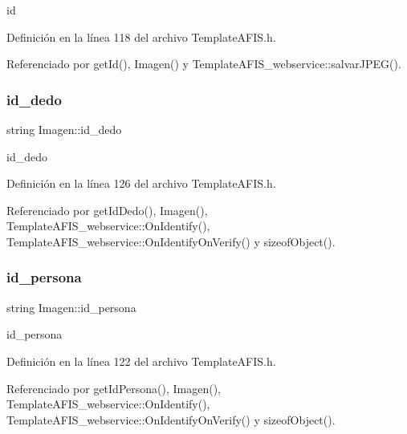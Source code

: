 id 



Definición en la línea 118 del archivo Template\+A\+F\+I\+S.\+h.



Referenciado por get\+Id(), Imagen() y Template\+A\+F\+I\+S\+\_\+webservice\+::salvar\+J\+P\+E\+G().

\hypertarget{classImagen_abdf777e9a6d41cb3b6ee54e9702d0e52}{}\label{classImagen_abdf777e9a6d41cb3b6ee54e9702d0e52} 
\subsubsection{\texorpdfstring{id\+\_\+dedo}{id\_dedo}}
{\footnotesize\ttfamily string Imagen\+::id\+\_\+dedo}



id\+\_\+dedo 



Definición en la línea 126 del archivo Template\+A\+F\+I\+S.\+h.



Referenciado por get\+Id\+Dedo(), Imagen(), Template\+A\+F\+I\+S\+\_\+webservice\+::\+On\+Identify(), Template\+A\+F\+I\+S\+\_\+webservice\+::\+On\+Identify\+On\+Verify() y sizeof\+Object().

\hypertarget{classImagen_aef38d4f4f82b0f19b4b13b20d66e38ba}{}\label{classImagen_aef38d4f4f82b0f19b4b13b20d66e38ba} 
\subsubsection{\texorpdfstring{id\+\_\+persona}{id\_persona}}
{\footnotesize\ttfamily string Imagen\+::id\+\_\+persona}



id\+\_\+persona 



Definición en la línea 122 del archivo Template\+A\+F\+I\+S.\+h.



Referenciado por get\+Id\+Persona(), Imagen(), Template\+A\+F\+I\+S\+\_\+webservice\+::\+On\+Identify(), Template\+A\+F\+I\+S\+\_\+webservice\+::\+On\+Identify\+On\+Verify() y sizeof\+Object().

\hypertarget{classImagen_a8485fa6dd60a7f067e2d2066599314b0}{}\label{classImagen_a8485fa6dd60a7f067e2d2066599314b0} 
